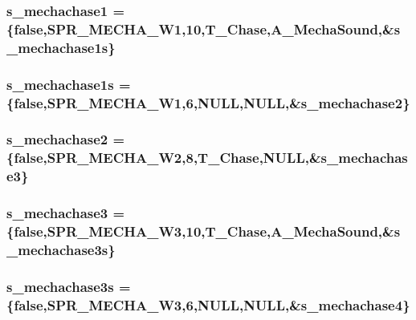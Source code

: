 \label{WL__ACT2_8C_ad357c8f3bb6a71e213ab45fd06f67489}
\hypertarget{WL__ACT2_8C_a7fd4292362075e6baaf13d0148e5c631}{
\subsubsection[{s\_\-mechachase1}]{ {\bf s\_\-mechachase1} = \{false,SPR\_\-MECHA\_\-W1,10,T\_\-Chase,A\_\-MechaSound,\&{\bf s\_\-mechachase1s}\}}}
\label{WL__ACT2_8C_a7fd4292362075e6baaf13d0148e5c631}
\hypertarget{WL__ACT2_8C_ac901c64e074ea0ed955fb159bb0ddf35}{
\subsubsection[{s\_\-mechachase1s}]{ {\bf s\_\-mechachase1s} = \{false,SPR\_\-MECHA\_\-W1,6,NULL,NULL,\&{\bf s\_\-mechachase2}\}}}
\label{WL__ACT2_8C_ac901c64e074ea0ed955fb159bb0ddf35}
\hypertarget{WL__ACT2_8C_a7757d348088221c1f7a0ec5154692bc5}{
\subsubsection[{s\_\-mechachase2}]{ {\bf s\_\-mechachase2} = \{false,SPR\_\-MECHA\_\-W2,8,T\_\-Chase,NULL,\&{\bf s\_\-mechachase3}\}}}
\label{WL__ACT2_8C_a7757d348088221c1f7a0ec5154692bc5}
\hypertarget{WL__ACT2_8C_af0b2e2eac1f309adf61b13dbfdd96fb0}{
\subsubsection[{s\_\-mechachase3}]{ {\bf s\_\-mechachase3} = \{false,SPR\_\-MECHA\_\-W3,10,T\_\-Chase,A\_\-MechaSound,\&{\bf s\_\-mechachase3s}\}}}
\label{WL__ACT2_8C_af0b2e2eac1f309adf61b13dbfdd96fb0}
\hypertarget{WL__ACT2_8C_aaf123e2cfe781d241e08844abca78b78}{
\subsubsection[{s\_\-mechachase3s}]{ {\bf s\_\-mechachase3s} = \{false,SPR\_\-MECHA\_\-W3,6,NULL,NULL,\&{\bf s\_\-mechachase4}\}}}
